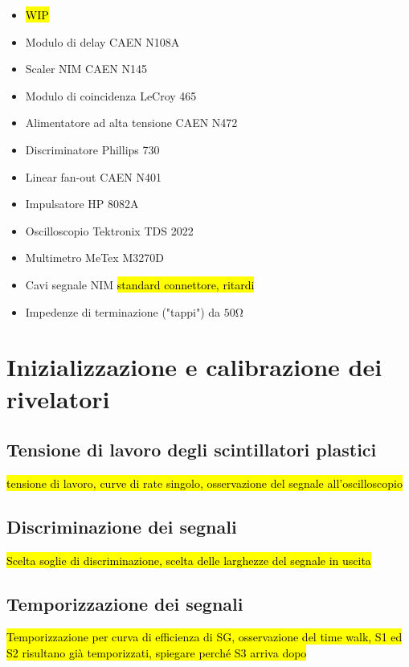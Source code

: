 \documentclass[a4paper, 11pt]{article}
\newcommand{\WIP}[1]{{\sethlcolor{cyan}\hl{#1}}}
\begin{document}
        \begin{itemize}
            \item \WIP{WIP}
            \item Modulo di delay CAEN N108A
            \item Scaler NIM CAEN N145
            \item Modulo di coincidenza LeCroy 465
            \item Alimentatore ad alta tensione CAEN N472 
            \item Discriminatore Phillips 730
            \item Linear fan-out CAEN N401
            \item Impulsatore HP 8082A
            \item Oscilloscopio Tektronix TDS 2022
            \item Multimetro MeTex M3270D
            \item Cavi segnale NIM \hl{standard connettore, ritardi}
            \item Impedenze di terminazione ("tappi") da $50\unit{\ohm}$ 
        \end{itemize}



     
    \newpage
\section{Inizializzazione e calibrazione dei rivelatori}

    \subsection{Tensione di lavoro degli scintillatori plastici}
        \hl{tensione di lavoro, curve di rate singolo, osservazione del segnale all'oscilloscopio}

    \subsection{Discriminazione dei segnali}
        \hl{Scelta soglie di discriminazione, scelta delle larghezze del segnale in uscita}

    \subsection{Temporizzazione dei segnali}
        \hl{Temporizzazione per curva di efficienza di SG, osservazione del time walk, S1 ed S2 risultano già temporizzati, spiegare perché S3 arriva dopo}
\end{document}
